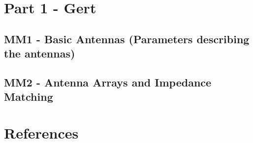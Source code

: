 



    \singlespacing
    \pagestyle{empty}	
	
	\cleardoublepage
	
	\pagestyle{plain}
		
	\tableofcontents 
	\onehalfspacing
	\pagestyle{fancy} %
    \setcounter{page}{0} %

\part{Part 1 - Gert}

\chapter{MM1 - Basic Antennas (Parameters describing the antennas)}





\chapter{MM2 - Antenna Arrays and Impedance Matching}







\part{References}






